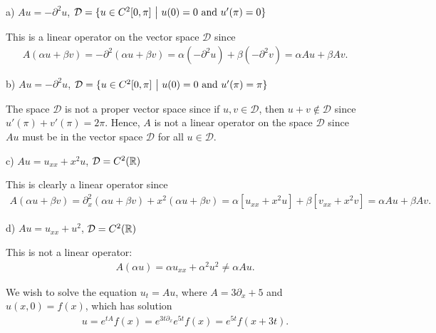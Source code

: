 \def\duedate{10/14/22}
\def\HWnum{6}



    

a) $\displaystyle Au = -\partial^2u$, $\mathcal{D} = \{ u \in C^2[0,\pi] ~\big|~ u(0) = 0 ~{\rm and}~ u'(\pi)=0 \}$

This is a linear operator on the vector space $\mathcal{D}$ since
\begin{eqnarray}
    \label{eq:lin-op-a}
    A(\alpha u + \beta v) = -\partial^2 (\alpha u + \beta v) = \alpha(-\partial^2 u) + \beta (-\partial^2 v) = \alpha Au + \beta Av
.\end{eqnarray}

b) $\displaystyle Au = -\partial^2u$, $\mathcal{D} = \{ u \in C^2[0,\pi] ~\big|~ u(0) = 0 ~{\rm and}~ u'(\pi)=\pi \}$

The space $\mathcal{D}$ is not a proper vector space since if $u,v \in \mathcal{D}$, then $u + v \not\in \mathcal{D}$ since $u'(\pi) + v'(\pi) = 2\pi$.
Hence, $A$ is not a linear operator on the space $\mathcal{D}$ since $Au$ must be in the vector space $\mathcal{D}$ for all $u \in \mathcal{D}$.

c) $\displaystyle Au = u_{xx} + x^2u$, $\mathcal{D} = C^2(\mathbb{R})$ 

This is clearly a linear operator since
\begin{eqnarray}
    \label{eq:lin-op-c}
    A(\alpha u + \beta v) = \partial_{x}^2(\alpha u + \beta v) + x^2(\alpha u + \beta v) = \alpha[u_{xx} + x^2u] + \beta[v_{xx} + x^2v] = \alpha Au + \beta Av
.\end{eqnarray}

d) $Au = u_{xx} + u^2$, $\mathcal{D} = C^2(\mathbb{R})$ 

This is not a linear operator:
\begin{eqnarray}
    \label{eq:lin-op-d}
    A(\alpha u) = \alpha u_{xx} + \alpha^2 u^2 \ne \alpha Au
.\end{eqnarray}



We wish to solve the equation $u_{t} = Au$, where $A = 3\partial_{x} + 5$ and $u(x,0) = f(x)$, which has solution 
\begin{eqnarray}
    \label{eq:solve-t-eq}
    u = e^{tA} f(x) = e^{3t\partial_{x}}e^{5t} f(x) = e^{5t}f(x+3t)
.\end{eqnarray}



